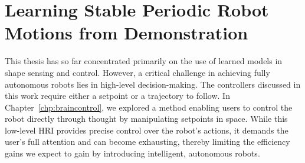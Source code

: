 \chapter{Learning Stable Periodic Robot Motions from Demonstration}
\label{chp:osmp}

\begin{foreword}
    This thesis has so far concentrated primarily on the use of learned models in shape sensing and control. However, a critical challenge in achieving fully autonomous robots lies in high-level decision-making. The controllers discussed in this work require either a setpoint or a trajectory to follow. In Chapter~\ref{chp:braincontrol}, we explored a method enabling users to control the robot directly through thought by manipulating setpoints in space. While this low-level \gls{HRI} provides precise control over the robot’s actions, it demands the user’s full attention and can become exhausting, thereby limiting the efficiency gains we expect to gain by introducing intelligent, autonomous robots.

\end{foreword}

